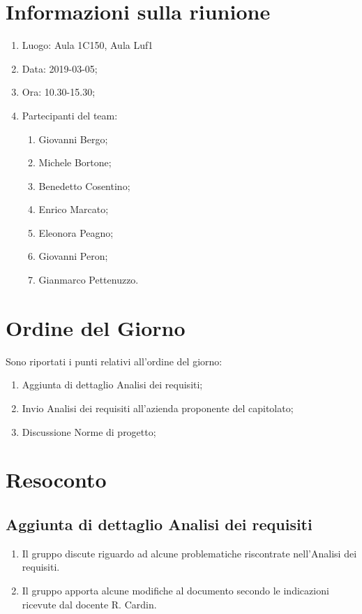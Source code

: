 \documentclass[11pt,a4paper]{article}
\begin{document}
	\section{Informazioni sulla riunione}
	\begin{enumerate}
		\item Luogo: Aula 1C150, Aula Luf1
		\item Data: 2019-03-05;
		\item Ora: 10.30-15.30;
		\item Partecipanti del team:
			\begin{enumerate}
				\item Giovanni Bergo;
				\item Michele Bortone;
				\item Benedetto Cosentino;
				\item Enrico Marcato;
				\item Eleonora Peagno;
				\item Giovanni Peron;
				\item Gianmarco Pettenuzzo.
				
			\end{enumerate}
	\end{enumerate}
	
	\section{Ordine del Giorno}
	Sono riportati i punti relativi all'ordine del giorno:
	\begin{enumerate}
		\item Aggiunta di dettaglio Analisi dei requisiti;
		\item Invio Analisi dei requisiti all'azienda proponente del capitolato;
		\item Discussione Norme di progetto;
	\end{enumerate}
	
	\section{Resoconto}
	\subsection{Aggiunta di dettaglio Analisi dei requisiti}
	\begin{enumerate}
		\item Il gruppo discute riguardo ad alcune problematiche riscontrate nell'Analisi dei requisiti.
		\item Il gruppo apporta alcune modifiche al documento secondo le indicazioni ricevute dal docente R. Cardin.
	\end{enumerate}
	
\end{document}

